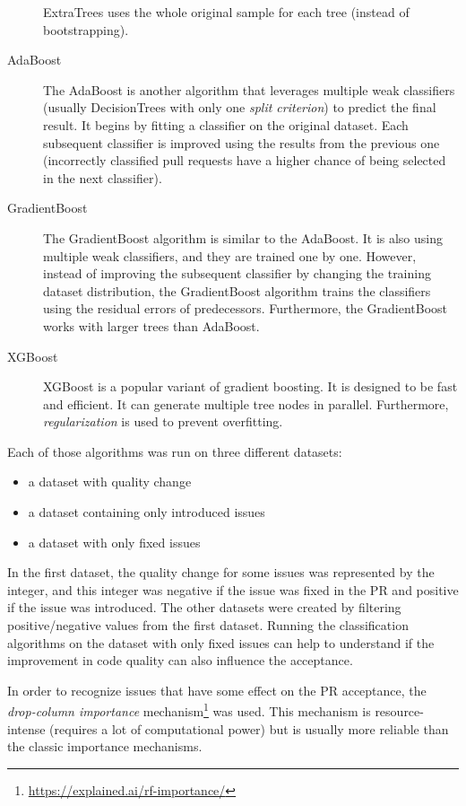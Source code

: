 \documentclass[digital,oneside,oldtable,nolof,nolot,nocover]{fithesis4}
\begin{document}
\begin{description}
ExtraTrees uses the whole original sample for each tree (instead of
bootstrapping).
\item[{AdaBoost~\cite{adaboost}}] The AdaBoost is another algorithm that leverages multiple weak classifiers
(usually DecisionTrees with only one \emph{split criterion}) to predict the final result. It begins by fitting a
classifier on the original dataset. Each subsequent classifier is
improved using the results from the previous one (incorrectly classified
pull requests have a higher chance of being selected in the next
classifier).
\item[{GradientBoost~\cite{gradient}}] The GradientBoost algorithm is similar to the AdaBoost. It is also
using multiple weak classifiers, and they are trained one by one. However,
instead of improving the
subsequent classifier by changing the training dataset distribution, the GradientBoost algorithm
trains the classifiers using the residual errors of predecessors. Furthermore, the GradientBoost
works with larger trees than AdaBoost.
\item[{XGBoost~\cite{xgboost}}] XGBoost is a popular variant of gradient boosting. It is designed to be fast
and efficient. It can generate multiple tree nodes in parallel. Furthermore, \emph{regularization} is used
to prevent overfitting.
\end{description}
Each of those algorithms was run on three different datasets:
\begin{itemize}
\item a dataset with quality change
\item a dataset containing only introduced issues
\item a dataset with only fixed issues
\end{itemize}
In the first dataset, the quality change for some issues was
represented by the integer, and this integer was negative if the issue was fixed in the PR
and positive if the issue was introduced. The other datasets were created by filtering
positive/negative values from the first dataset. Running the classification algorithms on
the dataset with only fixed issues can help to understand if the improvement in code quality
can also influence the acceptance.

In order to recognize issues that have some effect on the PR acceptance,
the \emph{drop-column importance} mechanism\footnote{\url{https://explained.ai/rf-importance/}} was used.
This mechanism is resource-intense (requires a lot of computational power) but is usually more reliable
than the classic importance mechanisms.
\end{document}
